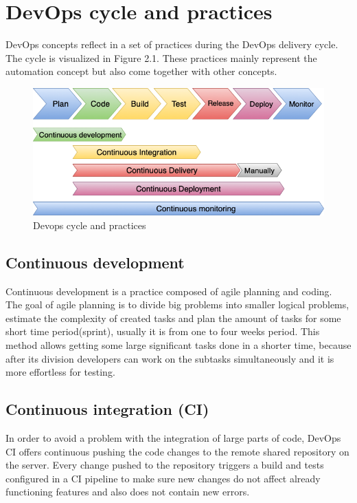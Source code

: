 \section{DevOps cycle and practices} DevOps concepts reflect in a set of practices during the DevOps delivery cycle. The cycle is visualized in Figure 2.1. These practices mainly represent the automation concept but also come together with other concepts. \cite{devops-principles}

\begin{figure}[h]
\centering
\includegraphics[scale=0.56]{../png/devops.png}
\caption{Devops cycle and practices}\label{picture:devops}
\end{figure}

\subsection{Continuous development} Continuous development is a practice composed of agile planning and coding. The goal of agile planning  is to divide big problems into smaller logical problems, estimate the complexity of created tasks and plan the amount of tasks for some short time period(sprint), usually it is from one to four weeks period. This method allows getting some large significant tasks done in a shorter time, because after its division developers can work on the subtasks simultaneously and it is more effortless for testing.

\subsection{Continuous integration (CI)} In order to avoid a problem with the integration of large parts of code, DevOps CI offers continuous pushing the code changes to the remote shared repository on the server. Every change pushed to the repository triggers a build and tests configured in a CI pipeline to make sure new changes do not affect already functioning features and also does not contain new errors.

